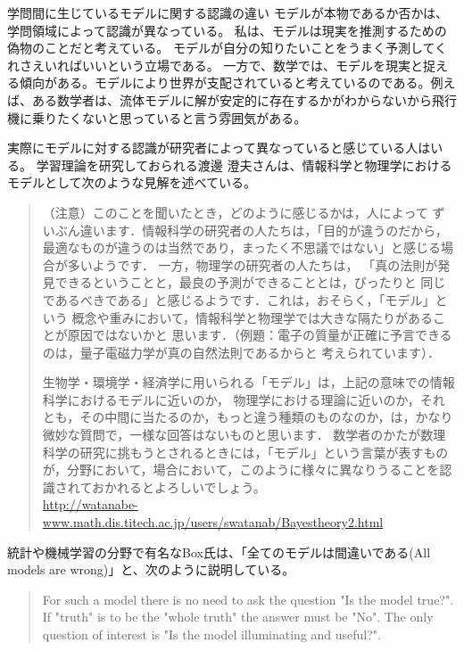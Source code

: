 \begin{SMbox}{学問間に生じているモデルに関する認識の違い}
モデルが本物であるか否かは、学問領域によって認識が異なっている。
私は、モデルは現実を推測するための偽物のことだと考えている。
モデルが自分の知りたいことをうまく予測してくれさえいればいいという立場である。
一方で、数学では、モデルを現実と捉える傾向がある。モデルにより世界が支配されていると考えているのである。例えば、ある数学者は、流体モデルに解が安定的に存在するかがわからないから飛行機に乗りたくないと思っていると言う雰囲気がある。

実際にモデルに対する認識が研究者によって異なっていると感じている人はいる。
学習理論を研究しておられる渡邊 澄夫さんは、情報科学と物理学におけるモデルとして次のような見解を述べている。
\begin{quote}
    （注意）このことを聞いたとき，どのように感じるかは，人によって ずいぶん違います．情報科学の研究者の人たちは，「目的が違うのだから， 最適なものが違うのは当然であり，まったく不思議ではない」と感じる場合が多いようです． 一方，物理学の研究者の人たちは， 「真の法則が発見できるということと，最良の予測ができることとは，ぴったりと 同じであるべきである」と感じるようです．これは，おそらく，「モデル」という 概念や重みにおいて，情報科学と物理学では大きな隔たりがあることが原因ではないかと 思います．（例題：電子の質量が正確に予言できるのは，量子電磁力学が真の自然法則であるからと 考えられています）．

    生物学・環境学・経済学に用いられる「モデル」は，上記の意味での情報科学におけるモデルに近いのか， 物理学における理論に近いのか，それとも，その中間に当たるのか，もっと違う種類のものなのか，は，かなり微妙な質問で，一様な回答はないものと思います． 数学者のかたが数理科学の研究に挑もうとされるときには，「モデル」という言葉が表すものが，分野において，場合において，このように様々に異なりうることを認識されておかれるとよろしいでしょう。
    \\ \url{http://watanabe-www.math.dis.titech.ac.jp/users/swatanab/Bayestheory2.html}
\end{quote}

統計や機械学習の分野で有名なBox氏は、「全てのモデルは間違いである(All models are wrong)」と、次のように説明している。

\begin{quote}
    For such a model there is no need to ask the question "Is the model true?". If "truth" is to be the "whole truth" the answer must be "No". The only question of interest is "Is the model illuminating and useful?".
\end{quote}


\end{SMbox}

